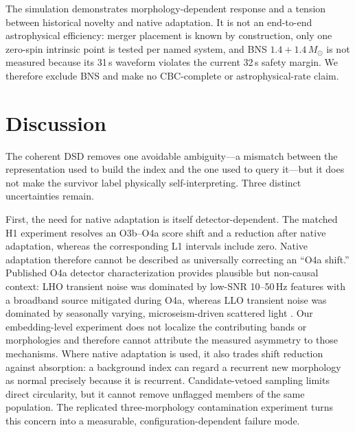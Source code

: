 \documentclass[12pt]{article}
\begin{document}
The simulation demonstrates morphology-dependent response and a tension
between historical novelty and native adaptation.  It is not an end-to-end
astrophysical efficiency: merger placement is known by construction, only one
zero-spin intrinsic point is tested per named system, and BNS
$1.4+1.4\,M_\odot$ is not measured
because its 31\,s waveform violates the current 32\,s safety margin.  We
therefore exclude BNS and make no CBC-complete or astrophysical-rate claim.

\section{Discussion}
\label{sec:discussion}

The coherent DSD removes one avoidable ambiguity---a mismatch between the
representation used to build the index and the one used to query it---but it
does not make the survivor label physically self-interpreting.  Three distinct
uncertainties remain.

First, the need for native adaptation is itself detector-dependent.  The
matched H1 experiment resolves an O3b--O4a score shift and a reduction after
native adaptation, whereas the corresponding L1 intervals include zero.
Native adaptation therefore cannot be described as universally correcting an
``O4a shift.''  Published O4a detector characterization provides plausible but
non-causal context: LHO transient noise was dominated by low-SNR 10--50\,Hz
features with a broadband source mitigated during O4a, whereas LLO transient
noise was dominated by seasonally varying, microseism-driven scattered light
\cite{soni2025}.  Our embedding-level experiment does not localize the
contributing bands or morphologies and therefore cannot attribute the measured
asymmetry to those mechanisms.  Where native adaptation is used, it also trades shift reduction against
absorption: a background index can regard a recurrent new morphology as normal
precisely because it is recurrent.  Candidate-vetoed sampling limits direct
circularity, but it cannot remove unflagged members of the same population.
The replicated three-morphology contamination experiment turns this concern
into a measurable, configuration-dependent failure mode.
\end{document}

